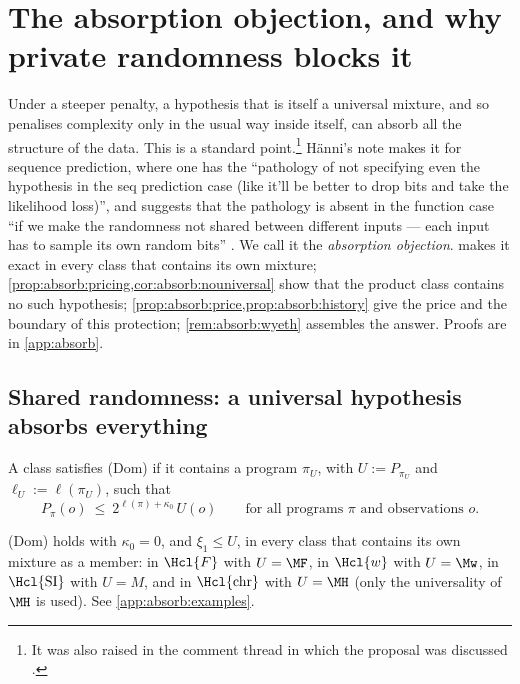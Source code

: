 \section{The absorption objection, and why private randomness blocks it}\label{sec:absorb}

Under a steeper penalty, a hypothesis that is itself a universal mixture, and so penalises complexity only in the usual way inside itself, can absorb all the structure of the data. This is a standard point.\footnote{It was also raised in the comment thread in which the proposal was discussed \citep{hanni2026lesswrong}.} H\"anni's note makes it for sequence prediction, where one has the ``pathology of not specifying even the hypothesis in the seq prediction case (like it'll be better to drop bits and take the likelihood loss)'', and suggests that the pathology is absent in the function case ``if we make the randomness not shared between different inputs --- each input has to sample its own random bits'' \citep{hanni2026notes}. We call it the \emph{absorption objection}.  makes it exact in every class that contains its own mixture; \cref{prop:absorb:pricing,cor:absorb:nouniversal} show that the product class contains no such hypothesis; \cref{prop:absorb:price,prop:absorb:history} give the price and the boundary of this protection; \cref{rem:absorb:wyeth} assembles the answer. Proofs are in \cref{app:absorb}.

\subsection{Shared randomness: a universal hypothesis absorbs everything}\label{sec:absorb:shared}

A class satisfies (Dom) if it contains a program $\pi_U$, with $U:=P_{\pi_U}$ and $\ell_U:=\ell(\pi_U)$, such that
\begin{equation}\label{eq:absorb:dom}
P_\pi(o)\ \le\ 2^{\ell(\pi)+\kappa_0}\,U(o)\qquad\text{for all programs $\pi$ and observations $o$.}\tag{Dom}
\end{equation}

\begin{remark}\label{rem:absorb:examples}
(Dom) holds with $\kappa_0=0$, and $\xi_1\le U$, in every class that contains its own mixture as a member: in $\Hcl{F}$ with $U=\MF$, in $\Hcl{w}$ with $U=\Mw$, in $\Hcl{\mathrm{SI}}$ with $U=M$, and in $\Hcl{\mathrm{chr}}$ with $U=\MH$ (only the universality of $\MH$ is used). See \cref{app:absorb:examples}.
\end{remark}

